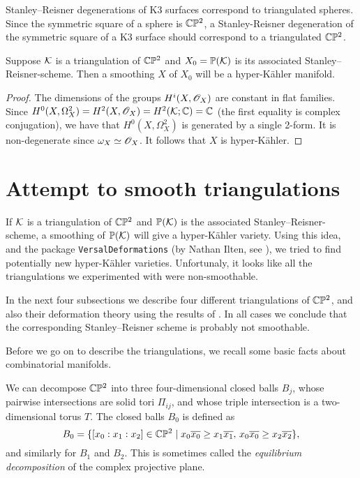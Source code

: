 Stanley--Reisner degenerations of K3 surfaces correspond to triangulated spheres. Since the symmetric square of a sphere is $\mathbb{C} \mathbb{P} ^2$, a Stanley-Reisner degeneration of the symmetric square of a K3 surface should correspond to a triangulated $\mathbb{C} \mathbb{P}^2$. 

\begin{proposition}
Suppose $\mathcal{K}$ is a triangulation of $\mathbb{C} \mathbb{P}^2$ and $X_0=\mathbb{P}(\mathcal{K})$ is its associated Stanley--Reisner-scheme. Then a smoothing $X$ of $X_0$ will be a hyper-Kähler manifold.
\end{proposition}
\begin{proof}
The dimensions of the groups $H^i(X,\mathscr{O}_X)$ are constant in flat families. Since $H^0(X,\Omega^2_X)=H^2(X,\mathscr{O}_X)=H^2(\mathcal{K};\mathbb{C})=\mathbb{C}$ (the first equality is complex conjugation), we have that $H^0(X,\Omega^2_X)$ is generated by a single 2-form. It is non-degenerate since $\omega_X \simeq \mathscr{O}_X$. It follows that $X$ is hyper-Kähler.
\end{proof}

\section{Attempt to smooth triangulations}

If $\mathcal{K}$ is a triangulation of $\mathbb{C} \mathbb{P}^2$ and $\mathbb{P}(\mathcal{K})$ is the associated Stanley--Reisner-scheme, a smoothing of $\mathbb{P}(\mathcal{K})$ will give a hyper-Kähler variety. Using this idea, and the \MM package \texttt{VersalDeformations} (by Nathan Ilten, see \cite{ilten_versaldeformations}), we tried to find potentially new hyper-Kähler varieties. Unfortunaly, it looks like all the triangulations we experimented with were non-smoothable.

In the next four subsections we describe four different triangulations of $\mathbb{C} \mathbb{P}^2$, and also their deformation theory using the results of \cite{deforming_christophersen}. In all cases we conclude that the corresponding Stanley--Reisner scheme is probably not smoothable.

Before we go on to describe the triangulations, we recall some basic facts about combinatorial manifolds.

We can decompose $\mathbb{C} \mathbb{P}^2$ into three four-dimensional closed balls $B_j$, whose pairwise intersections are solid tori $\Pi_{ij}$, and whose triple intersection is a two-dimensional torus $T$. The closed balls $B_0$ is defined as 
$$
B_0 = \{ [x_0:x_1:x_2] \in \mathbb{C} \mathbb{P} ^2 \mid x_0\overline{x_0} \geq x_1 \overline{x_1}, \,  x_0\overline{x_0} \geq x_2\overline{x_2} \},
$$
and similarly for $B_1$ and $B_2$. This is sometimes called the \emph{equilibrium decomposition} of the complex projective plane.

